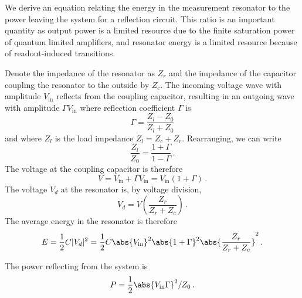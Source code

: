 
We derive an equation relating the energy in the measurement resonator to the power leaving the system for a reflection circuit.
This ratio is an important quantity as output power is a limited resource due to the finite saturation power of quantum limited amplifiers, and resonator energy is a limited resource because of readout-induced transitions.


Denote the impedance of the resonator as $Z_r$ and the impedance of the capacitor coupling the resonator to the outside by $Z_c$.
The incoming voltage wave with amplitude $V_\text{in}$ reflects from the coupling capacitor, resulting in an outgoing wave with amplitude $\Gamma V_\text{in}$ where reflection coefficient $\Gamma$ is
\begin{equation}
  \Gamma = \frac{Z_l - Z_0}{Z_l + Z_0}
\end{equation}
and where $Z_l$ is the load impedance $Z_l = Z_c + Z_r$.
Rearranging, we can write
\begin{equation}
  \frac{Z_l}{Z_0} = \frac{1 + \Gamma}{1 - \Gamma} \, .
\end{equation}
The voltage at the coupling capacitor is therefore
\begin{equation}
  V = V_\text{in} + \Gamma V_\text{in} = V_\text{in}(1 + \Gamma) \, .
\end{equation}
The voltage $V_d$ at the resonator is, by voltage division,
\begin{equation}
  V_d = V \left( \frac{Z_r}{Z_r + Z_c} \right) \, .
\end{equation}
The average energy in the resonator is therefore
\begin{equation}
  E
  = \frac{1}{2} C |V_d|^2
  = \frac{1}{2} C \abs{V_\text{in}}^2 \abs{1 + \Gamma}^2 \abs{\frac{Z_r}{Z_r + Z_c}}^2 \, .
\end{equation}


The power reflecting from the system is
\begin{equation}
  P = \frac{1}{2} \abs{V_\text{in} \Gamma}^2 / Z_0 \, .
\end{equation}

